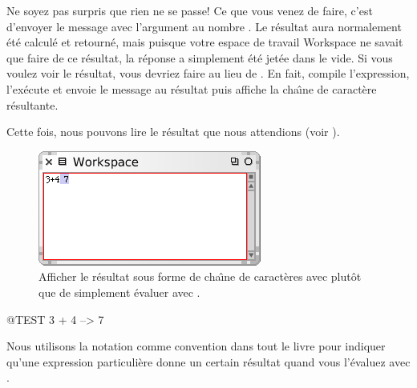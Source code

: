 \documentclass[a4paper,10pt,twoside]{book}
\begin{document}

Ne soyez pas surpris que rien ne se passe!
Ce que vous venez de faire, c'est d'envoyer le message \ct{+} avec
l'argument  au nombre . Le r\'esultat  aura
normalement \'et\'e calcul\'e et retourn\'e, mais puisque votre espace de
travail Workspace ne savait que faire de ce r\'esultat, la r\'eponse a
simplement \'et\'e jet\'ee dans le vide. Si vous voulez voir le
r\'esultat, vous devriez faire  au lieu
de . En fait,  compile l'expression,
l'ex\'ecute et envoie le message  au r\'esultat puis
affiche la cha\^{\i}ne de caract\`ere r\'esultante.

Cette fois, nous pouvons lire le r\'esultat que nous attendions (voir
).

\begin{figure}[htb]
\centerline {\includegraphics[scale=0.7]{PrintIt}}
\caption{Afficher le r\'esultat sous forme de cha\^{\i}ne de
  caract\`eres avec  plut\^ot que de simplement
  \'evaluer avec . \label{fig:printit}}
\end{figure}

\begin{code}{@TEST}
3 + 4 --> 7
\end{code}
\noindent
Nous utilisons la notation \ct{-->} comme convention dans tout le
livre pour indiquer qu'une expression particuli\`ere donne un certain
r\'esultat quand vous l'\'evaluez avec .

\end{document}
